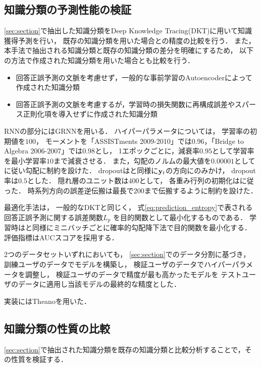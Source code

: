 \subsection{知識分類の予測性能の検証}

\ref{sec:section}で抽出した知識分類をDeep Knowledge Tracing(DKT)に用いて知識獲得予測を行い，
既存の知識分類を用いた場合との精度の比較を行う．
また，本手法で抽出される知識分類と既存の知識分類の差分を明確にするため，
以下の方法で作成された知識分類を用いた場合とも比較を行う．
\begin{itemize}
\item 回答正誤予測の文脈を考慮せず，一般的な事前学習のAutoencoderによって作成された知識分類\label{c1}
\item 回答正誤予測の文脈を考慮するが，学習時の損失関数に再構成誤差やスパース正則化項を導入せずに作成された知識分類\label{c2}
\end{itemize}

RNNの部分にはGRNNを用いる．
ハイパーパラメータについては，
学習率の初期値を$100$，
モーメントを「ASSISTments 2009-2010」では$0.96$，「Bridge to Algebra 2006-2007」では$0.98$とし，
1エポックごとに，減衰率$0.95$として学習率を最小学習率$10$まで減衰させる．
また，勾配のノルムの最大値を$0.00001$として\cite{pascanu2013difficulty}に従い勾配に制約を設けた．
dropoutは\cite{piech2015deep}と同様に${\bf y}_t$の方向にのみかけ，
dropout率は$0.5$とした．
隠れ層のユニット数は$400$として，
各重み行列の初期化は\cite{glorot2010understanding}に従った．
時系列方向の誤差逆伝搬は最長で$200$まで伝搬するように制約を設けた．

最適化手法は，
一般的なDKTと同じく，
式\ref{eq:prediction_entropy}で表される回答正誤予測に関する誤差関数$L_p$
を目的関数として最小化するものである．
学習時は\cite{piech2015deep}と同様にミニバッチごとに確率的勾配降下法で目的関数を最小化する．
評価指標はAUCスコアを採用する．

2つのデータセットいずれにおいても，
\ref{sec:section}でのデータ分割に基づき，
訓練ユーザのデータでモデルを構築し，
検証ユーザのデータでハイパーパラメータを調整し， 
検証ユーザのデータで精度が最も高かったモデルを
テストユーザのデータに適用し当該モデルの最終的な精度とした．

実装にはTheanoを用いた．


\subsection{知識分類の性質の比較}

\ref{sec:section}で抽出された知識分類を既存の知識分類と比較分析することで，その性質を検証する．

